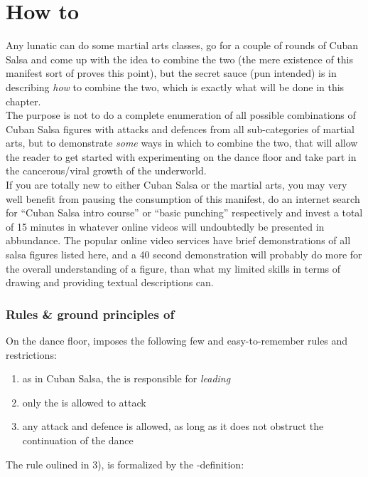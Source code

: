 \chapter*{How to \sectionsovs}

Any lunatic can do some martial arts classes, go for a couple of rounds of Cuban Salsa and come up with the idea to combine the two (the mere existence of this manifest sort of proves this point), but the secret sauce (pun intended) is in describing \textit{how} to combine the two, which is exactly what will be done in this chapter. \\
The purpose is not to do a complete enumeration of all possible combinations of Cuban Salsa figures with attacks and defences from all sub-categories of martial arts, but to demonstrate \textit{some} ways in which to combine the two, that will allow the reader to get started with experimenting on the dance floor and take part in the cancerous/viral growth of the \sovs underworld.\\
If you are totally new to either Cuban Salsa or the martial arts, you may very well benefit from pausing the consumption of this manifest, do an internet search for ``Cuban Salsa intro course'' or ``basic punching'' respectively and invest a total of 15 minutes in whatever online videos will undoubtedly be presented in abbundance. The popular online video services have brief demonstrations of all salsa figures listed here, and a 40 second demonstration will probably do more for the overall understanding of a figure, than what my limited skills in terms of drawing and providing textual descriptions can. \\

\subsection*{Rules \& ground principles of \sovs}
On the dance floor, \sovs imposes the following few and easy-to-remember rules and restrictions:

\begin{enumerate}
  \item as in Cuban Salsa, the \dude is responsible for \textit{leading}
  \item only the \gal is allowed to attack
  \item any attack and defence is allowed, as long as it does not obstruct the continuation of the dance
\end{enumerate}

The rule oulined in 3), is formalized by the -definition:

